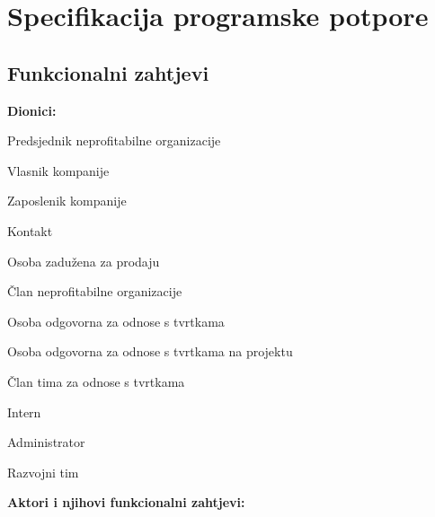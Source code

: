 \chapter{Specifikacija programske potpore}
		
	\section{Funkcionalni zahtjevi}
			




			\noindent \textbf{Dionici:}
			
			\begin{packed_enum}
				
				\item Predsjednik neprofitabilne organizacije
				\item Vlasnik kompanije
				\item Zaposlenik kompanije
					\item Kontakt
					\item Osoba zadužena za prodaju
				\item Član neprofitabilne organizacije
					\item Osoba odgovorna za odnose s tvrtkama
					\item Osoba odgovorna za odnose s tvrtkama na projektu
					\item Član tima za odnose s tvrtkama
					\item Intern
				\item Administrator
				\item Razvojni tim
				
			\end{packed_enum}
			
			\noindent \textbf{Aktori i njihovi funkcionalni zahtjevi:}
			
